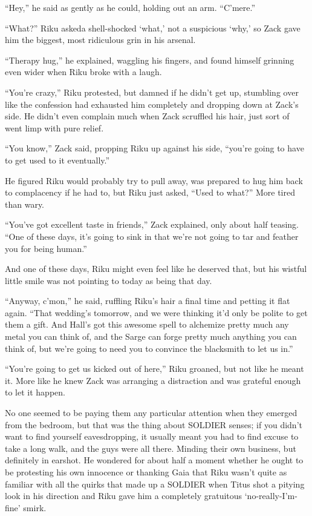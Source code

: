 ``Hey,'' he said as gently as he could, holding out an arm. ``C'mere.''

``What?'' Riku asked\textemdash a shell-shocked `what,' not a suspicious `why,' so Zack gave him the biggest, most ridiculous grin in his arsenal.

``Therapy hug,'' he explained, waggling his fingers, and found himself grinning even wider when Riku broke with a laugh.

``You're crazy,'' Riku protested, but damned if he didn't get up, stumbling over like the confession had exhausted him completely and dropping down at Zack's side. He didn't even complain much when Zack scruffled his hair, just sort of went limp with pure relief.

``You know,'' Zack said, propping Riku up against his side, ``you're going to have to get used to it eventually.''

He figured Riku would probably try to pull away, was prepared to hug him back to complacency if he had to, but Riku just asked, ``Used to what?'' More tired than wary.

``You've got excellent taste in friends,'' Zack explained, only about half teasing. ``One of these days, it's going to sink in that we're not going to tar and feather you for being human.''

And one of these days, Riku might even feel like he deserved that, but his wistful little smile was not pointing to today as being that day.

``Anyway, c'mon,'' he said, ruffling Riku's hair a final time and petting it flat again. ``That wedding's tomorrow, and we were thinking it'd only be polite to get them a gift. And Hall's got this awesome spell to alchemize pretty much any metal you can think of, and the Sarge can forge pretty much anything you can think of, but we're going to need you to convince the blacksmith to let us in.''

``You're going to get us kicked out of here,'' Riku groaned, but not like he meant it. More like he knew Zack was arranging a distraction and was grateful enough to let it happen.

No one seemed to be paying them any particular attention when they emerged from the bedroom, but that was the thing about SOLDIER senses; if you didn't want to find yourself eavesdropping, it usually meant you had to find excuse to take a long walk, and the guys were all there. Minding their own business, but definitely in earshot. He wondered for about half a moment whether he ought to be protesting his own innocence or thanking Gaia that Riku wasn't quite as familiar with all the quirks that made up a SOLDIER when Titus shot a pitying look in his direction and Riku gave him a completely gratuitous `no-really-I'm-fine' smirk.

